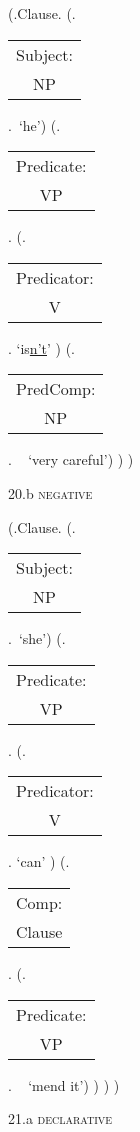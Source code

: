 \documentclass[12pt,letterpaper]{article}
\begin{document}
\begin{figure}
	\begin{center}
		\begin{parsetree}
			(.Clause.
			(.\begin{tabular}{c}Subject:\\NP\end{tabular}.~`he')
			(.\begin{tabular}{c}Predicate:\\VP\end{tabular}.
			(.\begin{tabular}{c}Predicator:\\V\end{tabular}. `is\underline{n't}' )
			(.\begin{tabular}{c}PredComp:\\NP\end{tabular}.  ~ `very careful')
			)
			)
			
			\hfill \break\hfill \break
		\end{parsetree}
		20.b \textsc{negative}
	\end{center}
\end{figure}

\begin{figure}
	\begin{center}
		\begin{parsetree}
			(.Clause.
			(.\begin{tabular}{c}Subject:\\NP\end{tabular}.~`she')
			(.\begin{tabular}{c}Predicate:\\VP\end{tabular}.
			(.\begin{tabular}{c}Predicator:\\V\end{tabular}. `can' )
			(.\begin{tabular}{c}Comp:\\Clause\end{tabular}.
			(.\begin{tabular}{c}Predicate:\\VP\end{tabular}. ~ `mend it')
			)
			)
			)
			
			\hfill \break\hfill \break
		\end{parsetree}
		21.a \textsc{declarative}
	\end{center}
\end{figure}
\end{document}
